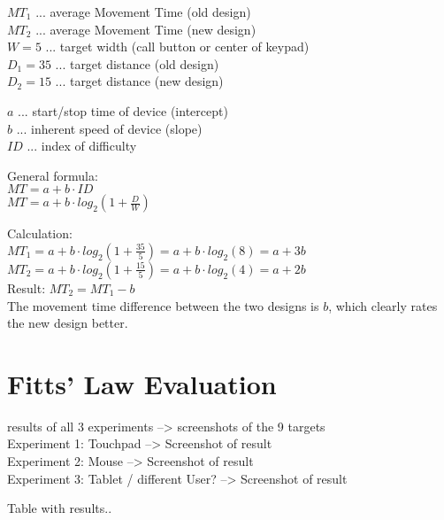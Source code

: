 \documentclass[a4paper,twoside,10pt]{article}
\begin{document}
$MT_1$ ... average Movement Time (old design) \\
$MT_2$ ... average Movement Time (new design) \\
$W = 5$ ... target width (call button or center of keypad) \\
$D_1 = 35$ ...  target distance (old design) \\
$D_2 = 15$ ... target distance (new design) 

$a$ ... start/stop time of device (intercept) \\
$b$ ... inherent speed of device (slope) \\
$ID$ ... index of difficulty

General formula: \\
$MT = a + b \cdot ID$ \\
$MT = a + b \cdot log_2 (1 + \frac{D}{W})$ 

Calculation: \\
$MT_1 = a + b \cdot log_2 (1 + \frac{35}{5}) = a + b \cdot log_2(8) = a + 3b$ \\
$MT_2 = a + b \cdot log_2 (1 + \frac{15}{5}) = a + b \cdot log_2(4) = a + 2b$ \\
Result: $MT_2 = MT_1 - b$ \\
The movement time difference between the two designs is $b$, which clearly rates the new design better.

\section{Fitts' Law Evaluation}
results of all 3 experiments --> screenshots of the 9 targets\\
Experiment 1: Touchpad --> Screenshot of result\\
Experiment 2: Mouse --> Screenshot of result\\
Experiment 3: Tablet / different User? --> Screenshot of result

Table with results..


\vspace{1cm}

\end{document}
